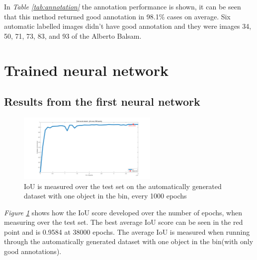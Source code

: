\begin{table}[h]
\caption{Annotation on the automatically generated dataset with one object in the bin }
\label{tab:annotation}
\end{table}

In \textit{Table \ref{tab:annotation}} the annotation performance is shown, it can be seen that this method returned good annotation in 98.1\% cases on average. Six automatic labelled images didn’t have good annotation and they were images 34, 50, 71, 73, 83, and 93 of the Alberto Balsam.
\clearpage
\section{Trained neural network}
\subsection{Results from the first neural network} \label{sec:firstneural}
\begin{figure}[h]
    \centering
    \includegraphics[width=0.6\textwidth, trim={5cm 0 4cm 0},clip]{graphics/results/neuralnetworkauto.png}
    \caption{IoU is measured over the test set on the automatically generated dataset with one object in the bin, every 1000 epochs}
    \label{fig:neuralnetwork}
\end{figure}
\textit{Figure \ref{fig:neuralnetwork}} shows how the IoU score developed over the number of epochs, when measuring over the test set. The best average IoU score can be seen in the red point and is 0.9584 at 38000 epochs. The average IoU is measured when running through the automatically generated dataset with one object in the bin(with only good annotations).

